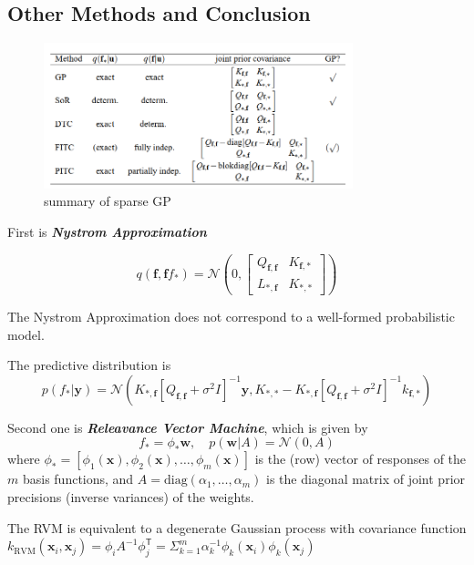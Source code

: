 \documentclass[10pt]{elegantbook}
\newcommand{\mydefination}[1]{\textbf{\textit{\textcolor{structurecolor}{#1}}}}
\begin{document}
\subsection{Other Methods and Conclusion}

\begin{figure}[htbp]
    \centering
    \includegraphics[width=0.8\textwidth]{image/sparse_gp_summary.png}
    \caption{summary of sparse GP} \label{fig:sparse_gp_summary}
\end{figure}

First is \mydefination{Nystrom Approximation}

\begin{equation}
    q(\mathbf f, \mathbf f f_*) = \mathcal N \left ( 0, \begin{bmatrix}
        Q_{\mathbf f, \mathbf f} & K_{\mathbf f, *} \\
        L_{*, \mathbf f} & K_{*, *}
    \end{bmatrix} \right )
\end{equation}

\begin{remark}
    The Nystrom Approximation does not correspond to a well-formed probabilistic model.
\end{remark}

The predictive distribution is 
\begin{equation}
    p(f_* | \mathbf y) = \mathcal N \left ( 
        K_{*, \mathbf f} [Q_{\mathbf f, \mathbf f} + \sigma^2 I]^{-1} \mathbf y, K_{*,  *} - K_{*, \mathbf f} [Q_{\mathbf f, \mathbf f} + \sigma^2 I]^{-1} k_{\mathbf f, *}    
    \right )
\end{equation}

Second one is \mydefination{Releavance Vector Machine}, which is given by
\begin{equation}
    f_* = \phi_* \mathbf w, \quad p(\mathbf w | A) = \mathcal N(0, A)
\end{equation}
where $\phi_* = [\phi_1(\mathbf x), \phi_2(\mathbf x), \ldots, \phi_m(\mathbf x)]$ is the (row) vector of responses of the $m$ basis functions, and
$A = \text{diag}(\alpha_1, \ldots, \alpha_m)$ is the diagonal matrix of joint prior precisions (inverse variances) of the weights.

\begin{remark}
    The RVM is equivalent to a degenerate Gaussian process with covariance function $k_{\mathrm{{RVM}}}(\mathbf{x}_{i},\mathbf{x}_{j})=\phi_{i}A^{-1}\phi_{j}^{\mathsf{T}}=\Sigma_{k=1}^{m}\alpha_{k}^{-1}\phi_{k}(\mathbf{x}_{i}) \phi_{k}(\mathbf{x}_{j})$
\end{remark}
\end{document}
